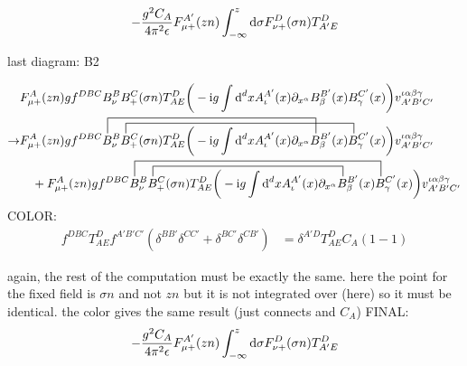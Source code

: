 \begin{align}
	-\frac{ g^2 C_A}{4\pi^2 \epsilon} 
	F_{\mu +}^{A'}(zn)\int_{-\infty}^z \text{d} \sigma F_{\nu +}^D (\sigma n) T^D_{A'E}
\end{align}

last diagram: B2

\begin{align}
	&\ft_{\mu+}^A(zn) gf^{DBC}B_\nu^BB_+^C(\sigma n) T^D_{AE}\bigg(-\imag g \int \ddx xA_\iota^{A'}(x) \partial_{x^\alpha} B_\beta^{B'} (x) B_\gamma^{C'}(x) \bigg) v^{\iota \alpha\beta\gamma}_{A'B'C'}
	\\
	\rightarrow &
	\contraction[3ex]{\ft_{\mu+}^A(zn) gf^{DBC}}{B}{_\nu^BB_+^C(\sigma n) T^D_{AE}\bigg(-\imag g \int \ddx xA_\iota^{A'}(x) \partial_{x^\alpha} }{B}
	\contraction[2ex]{\ft_{\mu+}^A(zn) gf^{DBC}B_\nu^B}{B}{_+^C(\sigma n) T^D_{AE}\bigg(-\imag g \int \ddx xA_\iota^{A'}(x) \partial_{x^\alpha} B_\beta^{B'} (x) }{B}
	\ft_{\mu+}^A(zn) gf^{DBC}B_\nu^BB_+^C(\sigma n) T^D_{AE}\bigg(-\imag g \int \ddx xA_\iota^{A'}(x) \partial_{x^\alpha} B_\beta^{B'} (x) B_\gamma^{C'}(x) \bigg) v^{\iota \alpha\beta\gamma}_{A'B'C'}
	\nl
	\contraction[3ex]{+\ft_{\mu+}^A(zn) gf^{DBC}}{B}{_\nu^BB_+^C(\sigma n) T^D_{AE}\bigg(-\imag g \int \ddx xA_\iota^{A'}(x) \partial_{x^\alpha} B_\beta^{B'} (x) }{B}
	\contraction[2ex]{+\ft_{\mu+}^A(zn) gf^{DBC}B_\nu^B}{B}{_+^C(\sigma n) T^D_{AE}\bigg(-\imag g \int \ddx xA_\iota^{A'}(x) \partial_{x^\alpha}}{B}
	+\ft_{\mu+}^A(zn) gf^{DBC}B_\nu^BB_+^C(\sigma n) T^D_{AE}\bigg(-\imag g \int \ddx xA_\iota^{A'}(x) \partial_{x^\alpha} B_\beta^{B'} (x) B_\gamma^{C'}(x) \bigg) v^{\iota \alpha\beta\gamma}_{A'B'C'}
\end{align}
COLOR:
\begin{align}
	f^{DBC}T^D_{AE}f^{A'B'C'} (\delta^{BB'}\delta^{CC'}+\delta^{BC'}\delta^{CB'})
	&=
	\delta^{A'D}T^D_{AE}C_A(1-1)
\end{align}

again, the rest of the computation must be exactly the same. here the point for the fixed field is $\sigma n$ and not $zn$ but it is not integrated over (here) so it must be identical. the color gives the same result (just connects and $C_A$)
FINAL:
\begin{align}
-\frac{ g^2 C_A}{4\pi^2 \epsilon} 
F_{\mu +}^{A'}(zn)\int_{-\infty}^z \text{d} \sigma F_{\nu +}^D (\sigma n) T^D_{A'E}
\end{align}


